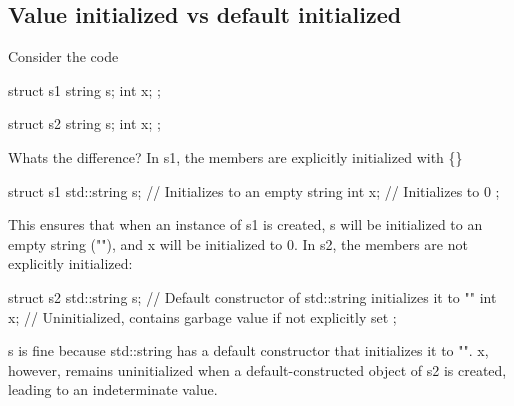 \documentclass{report}
\begin{document}
    \pagebreak 
    \bigbreak \noindent 
    \subsection{Value initialized vs default initialized}
    \bigbreak \noindent 
    Consider the code
    \bigbreak \noindent 
    \begin{cppcode}
        struct s1 {
            string s{};
            int x{};
        };

        struct s2 {
            string s;
            int x;
        };
    \end{cppcode}
    \bigbreak \noindent 
    Whats the difference? In s1, the members are explicitly initialized with \{\}
    \bigbreak \noindent 
    \begin{cppcode}
        struct s1 {
            std::string s{};  // Initializes to an empty string
            int x{};          // Initializes to 0
        };
    \end{cppcode}
    \bigbreak \noindent 
    This ensures that when an instance of s1 is created, s will be initialized to an empty string (""), and x will be initialized to 0.
    \bigbreak \noindent 
    In s2, the members are not explicitly initialized:
    \bigbreak \noindent 
    \begin{cppcode}
        struct s2 {
            std::string s;  // Default constructor of std::string initializes it to ""
            int x;          // Uninitialized, contains garbage value if not explicitly set
        };
    \end{cppcode}
    \bigbreak \noindent 
    s is fine because std::string has a default constructor that initializes it to "".
    \bigbreak \noindent 
    x, however, remains uninitialized when a default-constructed object of s2 is created, leading to an indeterminate value.







    \bigbreak \noindent 
\end{document}

